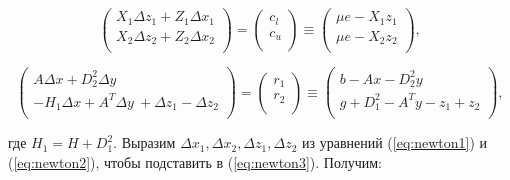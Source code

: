 \documentclass[a4paper, 12pt, titlepage]{article}
\theoremstyle{definition}
\theoremstyle{plain}
\theoremstyle{plain}
\begin{document}
\begin{equation}
\label{eq:newton2}
 \left(
  \begin{array}{c}
   X_{1} \Delta z_{1} + Z_{1} \Delta x_{1} \\
   X_{2} \Delta z_{2} + Z_{2} \Delta x_{2} \\
   \end{array}
 \right) =
 \left(
  \begin{array}{c}
   c_{l} \\
   c_{u} \\
   \end{array}
 \right) \equiv
 \left(
  \begin{array}{c}
   \mu e - X_{1} z_{1} \\
   \mu e - X_{2} z_{2} \\
   \end{array}
 \right),
\end{equation}

\begin{equation}
\label{eq:newton3}
 \left(
  \begin{array}{c}
   A \Delta x + D_{2}^{2} \Delta y \\
   -H_{1} \Delta x + A^{T} \Delta y\ + \Delta z_{1} - \Delta z_{2} \\
   \end{array}
 \right) =
 \left(
  \begin{array}{c}
   r_{1} \\
   r_{2} \\
   \end{array}
 \right) \equiv
 \left(
  \begin{array}{c}
   b - A x - D_{2}^{2} y \\
   g + D_{1}^{2} - A^{T} y - z_{1} + z_{2} \\
   \end{array}
 \right),
\end{equation}

где $H_{1} = H + D_{1}^{2}$. Выразим
$\Delta x_{1}, \Delta x_{2}, \Delta z_{1}, \Delta z_{2}$ из уравнений
(\ref{eq:newton1}) и (\ref{eq:newton2}), чтобы подставить в (\ref{eq:newton3}).
Получим:
\end{document}
